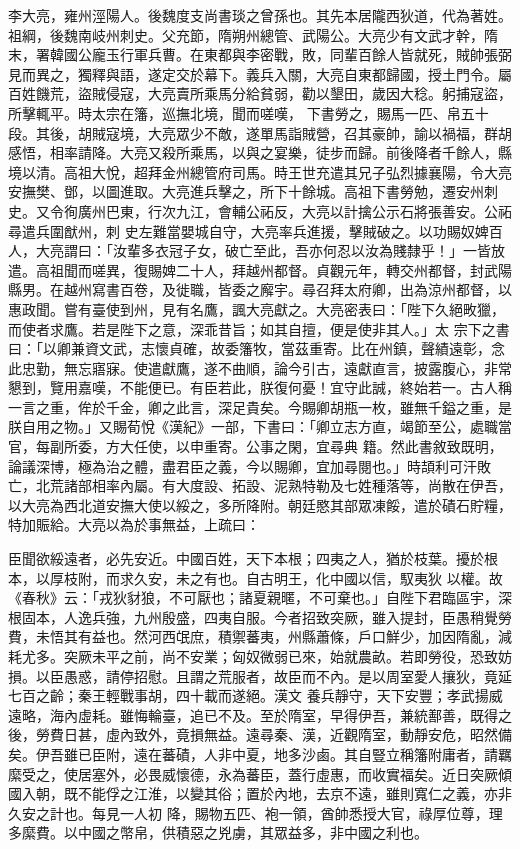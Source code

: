 \begin{pinyinscope}
 李大亮，雍州涇陽人。後魏度支尚書琰之曾孫也。其先本居隴西狄道，代為著姓。祖綱，後魏南岐州刺史。父充節，隋朔州總管、武陽公。大亮少有文武才幹，隋末，署韓國公龐玉行軍兵曹。在東都與李密戰，敗，同輩百餘人皆就死，賊帥張弼見而異之，獨釋與語，遂定交於幕下。義兵入關，大亮自東都歸國，授土門令。屬百姓饑荒，盜賊侵寇，大亮賣所乘馬分給貧弱，勸以墾田，歲因大稔。躬捕寇盜，所擊輒平。時太宗在籓，巡撫北境，聞而嗟嘆，
 下書勞之，賜馬一匹、帛五十段。其後，胡賊寇境，大亮眾少不敵，遂單馬詣賊營，召其豪帥，諭以禍福，群胡感悟，相率請降。大亮又殺所乘馬，以與之宴樂，徒步而歸。前後降者千餘人，縣境以清。高祖大悅，超拜金州總管府司馬。時王世充遣其兄子弘烈據襄陽，令大亮安撫樊、鄧，以圖進取。大亮進兵擊之，所下十餘城。高祖下書勞勉，遷安州刺史。又令徇廣州巴東，行次九江，會輔公祏反，大亮以計擒公示石將張善安。公祏尋遣兵圍猷州，刺
 史左難當嬰城自守，大亮率兵進援，擊賊破之。以功賜奴婢百人，大亮謂曰：「汝輩多衣冠子女，破亡至此，吾亦何忍以汝為賤隸乎！」一皆放遣。高祖聞而嗟異，復賜婢二十人，拜越州都督。貞觀元年，轉交州都督，封武陽縣男。在越州寫書百卷，及徙職，皆委之廨宇。尋召拜太府卿，出為涼州都督，以惠政聞。嘗有臺使到州，見有名鷹，諷大亮獻之。大亮密表曰：「陛下久絕畋獵，而使者求鷹。若是陛下之意，深乖昔旨；如其自擅，便是使非其人。」太
 宗下之書曰：「以卿兼資文武，志懷貞確，故委籓牧，當茲重寄。比在州鎮，聲績遠彰，念此忠勤，無忘寤寐。使遣獻鷹，遂不曲順，論今引古，遠獻直言，披露腹心，非常懇到，覽用嘉嘆，不能便已。有臣若此，朕復何憂！宜守此誠，終始若一。古人稱一言之重，侔於千金，卿之此言，深足貴矣。今賜卿胡瓶一枚，雖無千鎰之重，是朕自用之物。」又賜荀悅《漢紀》一部，下書曰：「卿立志方直，竭節至公，處職當官，每副所委，方大任使，以申重寄。公事之閑，宜尋典
 籍。然此書敘致既明，論議深博，極為治之體，盡君臣之義，今以賜卿，宜加尋閱也。」時頡利可汗敗亡，北荒諸部相率內屬。有大度設、拓設、泥熟特勒及七姓種落等，尚散在伊吾，以大亮為西北道安撫大使以綏之，多所降附。朝廷愍其部眾凍餒，遣於磧石貯糧，特加賑給。大亮以為於事無益，上疏曰：



 臣聞欲綏遠者，必先安近。中國百姓，天下本根；四夷之人，猶於枝葉。擾於根本，以厚枝附，而求久安，未之有也。自古明王，化中國以信，馭夷狄
 以權。故《春秋》云：「戎狄豺狼，不可厭也；諸夏親暱，不可棄也。」自陛下君臨區宇，深根固本，人逸兵強，九州殷盛，四夷自服。今者招致突厥，雖入提封，臣愚稍覺勞費，未悟其有益也。然河西氓庶，積禦蕃夷，州縣蕭條，戶口鮮少，加因隋亂，減耗尤多。突厥未平之前，尚不安業；匈奴微弱已來，始就農畝。若即勞役，恐致妨損。以臣愚惑，請停招慰。且謂之荒服者，故臣而不內。是以周室愛人攘狄，竟延七百之齡；秦王輕戰事胡，四十載而遂絕。漢文
 養兵靜守，天下安豐；孝武揚威遠略，海內虛耗。雖悔輪臺，追已不及。至於隋室，早得伊吾，兼統鄯善，既得之後，勞費日甚，虛內致外，竟損無益。遠尋秦、漢，近觀隋室，動靜安危，昭然備矣。伊吾雖已臣附，遠在蕃磧，人非中夏，地多沙鹵。其自豎立稱籓附庸者，請羈縻受之，使居塞外，必畏威懷德，永為蕃臣，蓋行虛惠，而收實福矣。近日突厥傾國入朝，既不能俘之江淮，以變其俗；置於內地，去京不遠，雖則寬仁之義，亦非久安之計也。每見一人初
 降，賜物五匹、袍一領，酋帥悉授大官，祿厚位尊，理多縻費。以中國之幣帛，供積惡之兇虜，其眾益多，非中國之利也。




\end{pinyinscope}

